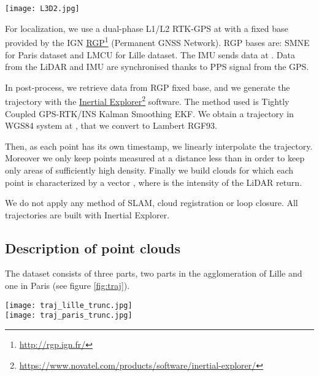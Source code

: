 \documentclass[a4paper, 10pt, journal]{article}
\begin{document}
\begin{center}\centering
 \texttt{[image: L3D2.jpg]}
\end{center}

For localization, we use a dual-phase L1/L2 RTK-GPS at  with a fixed base provided by the IGN \href{http://rgp.ign.fr/}{RGP}\footnote{\url{http://rgp.ign.fr/}} (Permanent GNSS Network). RGP bases are: SMNE for Paris dataset and LMCU for Lille dataset. The IMU sends data at .
Data from the LiDAR and IMU are synchronised thanks to  PPS signal from the GPS.

In post-process, we retrieve data from RGP fixed base, and we generate the trajectory with the \href{https://www.novatel.com/products/software/inertial-explorer/}{Inertial Explorer}\footnote{\url{https://www.novatel.com/products/software/inertial-explorer/}} software. The method used is Tightly Coupled GPS-RTK/INS Kalman Smoothing EKF. We obtain a trajectory in WGS84 system at , that we convert to Lambert RGF93.

Then, as each point has its own timestamp, we linearly interpolate the trajectory. Moreover we only keep points measured at a distance less than  in order to keep only areas of sufficiently high density. Finally we build clouds for which each point is characterized by a vector , where  is the intensity of the LiDAR return.

We do not apply any method of SLAM, cloud registration or loop closure. All trajectories are built with Inertial Explorer.

\subsection{Description of point clouds} \label{subsec:description_pc}

The dataset consists of three parts, two parts in the agglomeration of Lille and one in Paris (see figure \ref{fig:traj}).

\begin{center}\centering
 \texttt{[image: traj\_lille\_trunc.jpg]}
\\ \vspace{0.1cm}
 \texttt{[image: traj\_paris\_trunc.jpg]}
\end{center}
\end{document}
